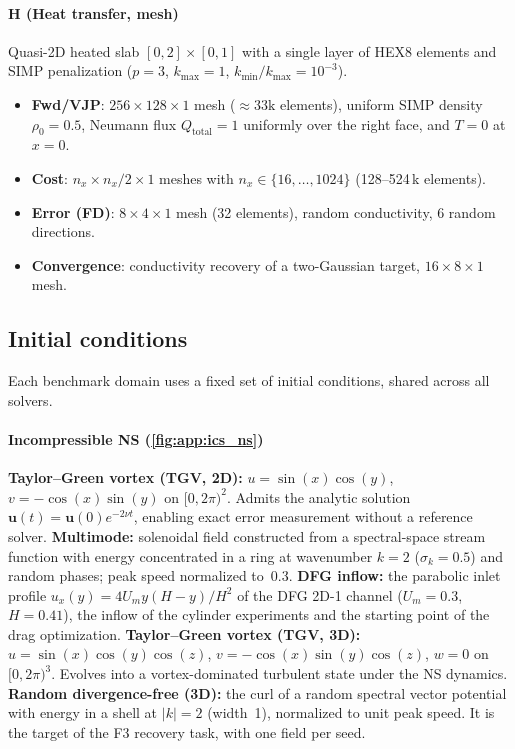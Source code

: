 \paragraph{H (Heat transfer, mesh)}
Quasi-2D heated slab $[0,2]\times[0,1]$ with a single layer of HEX8 elements
and SIMP penalization ($p=3$, $k_\text{max}=1$, $k_\text{min}/k_\text{max}=10^{-3}$).
\begin{itemize}\itemsep0pt
  \item \textbf{Fwd/VJP}: $256\times128\times1$ mesh (${\approx}33\text{k}$
        elements), uniform SIMP density $\rho_0=0.5$, Neumann flux
        $Q_\text{total}=1$ uniformly over the right face, and $T=0$ at $x=0$.
  \item \textbf{Cost}: $n_x\times n_x/2\times1$ meshes with
        $n_x\in\{16,\ldots,1024\}$ (128--524\,k elements).
  \item \textbf{Error (FD)}: $8\times4\times1$ mesh (32 elements), random
        conductivity, 6 random directions.
  \item \textbf{Convergence}: conductivity recovery of a two-Gaussian target,
        $16\times8\times1$ mesh.
\end{itemize}

\subsection{Initial conditions}
\label{app:ics}

Each benchmark domain uses a fixed set of initial conditions, shared across
all solvers.

\paragraph{Incompressible NS (\cref{fig:app:ics_ns})}
\textbf{Taylor--Green vortex (TGV, 2D):}
$u = \sin(x)\cos(y)$, $v = -\cos(x)\sin(y)$ on $[0,2\pi)^2$.
Admits the analytic solution $\mathbf{u}(t)=\mathbf{u}(0)e^{-2\nu t}$,
enabling exact error measurement without a reference solver.
\textbf{Multimode:} solenoidal field constructed from a spectral-space
stream function with energy concentrated in a ring at wavenumber $k=2$
($\sigma_k=0.5$) and random phases; peak speed normalized to~0.3.
\textbf{DFG inflow:} the parabolic inlet profile $u_x(y)=4U_m y(H-y)/H^2$ of the
DFG 2D-1 channel ($U_m=0.3$, $H=0.41$), the inflow of the cylinder experiments
and the starting point of the drag optimization.
\textbf{Taylor--Green vortex (TGV, 3D):}
$u = \sin(x)\cos(y)\cos(z)$, $v = -\cos(x)\sin(y)\cos(z)$, $w = 0$
on $[0,2\pi)^3$.
Evolves into a vortex-dominated turbulent state under the NS dynamics.
\textbf{Random divergence-free (3D):} the curl of a random spectral vector
potential with energy in a shell at $|k|=2$ (width~1), normalized to unit peak
speed. It is the target of the F3 recovery task, with one field per seed.

